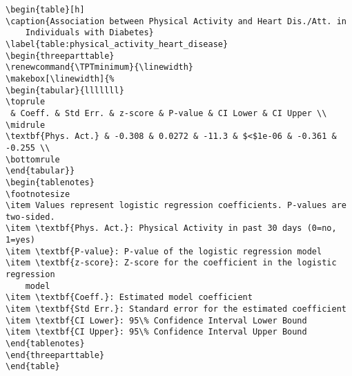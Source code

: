 \documentclass[11pt]{article}
\begin{document}
\begin{Verbatim}[tabsize=4]
\begin{table}[h]
\caption{Association between Physical Activity and Heart Dis./Att. in
	Individuals with Diabetes}
\label{table:physical_activity_heart_disease}
\begin{threeparttable}
\renewcommand{\TPTminimum}{\linewidth}
\makebox[\linewidth]{%
\begin{tabular}{lllllll}
\toprule
 & Coeff. & Std Err. & z-score & P-value & CI Lower & CI Upper \\
\midrule
\textbf{Phys. Act.} & -0.308 & 0.0272 & -11.3 & $<$1e-06 & -0.361 & -0.255 \\
\bottomrule
\end{tabular}}
\begin{tablenotes}
\footnotesize
\item Values represent logistic regression coefficients. P-values are two-sided.
\item \textbf{Phys. Act.}: Physical Activity in past 30 days (0=no, 1=yes)
\item \textbf{P-value}: P-value of the logistic regression model
\item \textbf{z-score}: Z-score for the coefficient in the logistic regression
	model
\item \textbf{Coeff.}: Estimated model coefficient
\item \textbf{Std Err.}: Standard error for the estimated coefficient
\item \textbf{CI Lower}: 95\% Confidence Interval Lower Bound
\item \textbf{CI Upper}: 95\% Confidence Interval Upper Bound
\end{tablenotes}
\end{threeparttable}
\end{table}

\end{Verbatim}




\end{document}
